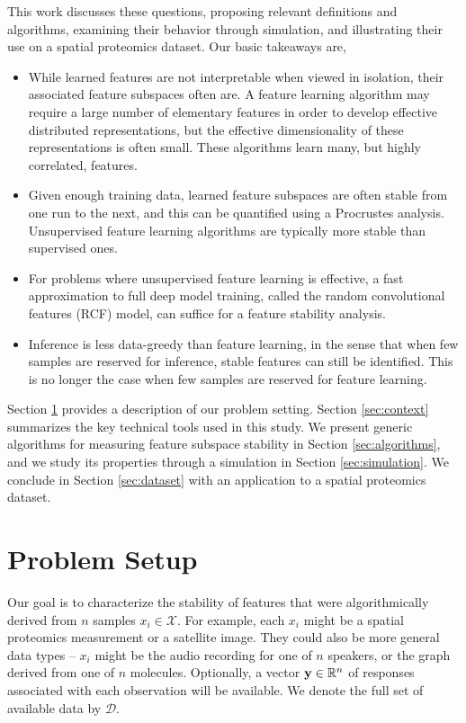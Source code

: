 This work discusses these questions, proposing relevant definitions and
algorithms, examining their behavior through simulation, and illustrating their
use on a spatial proteomics dataset. Our basic takeaways are,

\begin{itemize}
\item While learned features are not interpretable when viewed in isolation,
  their associated feature subspaces often are. A feature learning algorithm may
  require a large number of elementary features in order to develop effective
  distributed representations, but the effective dimensionality of these
  representations is often small. These algorithms learn many, but highly
  correlated, features.
\item Given enough training data, learned feature subspaces are often stable
  from one run to the next, and this can be quantified using a Procrustes
  analysis. Unsupervised feature learning algorithms are typically more stable
  than supervised ones.
\item For problems where unsupervised feature learning is effective, a fast
  approximation to full deep model training, called the random convolutional
  features (RCF) model, can suffice for a feature stability analysis.
\item Inference is less data-greedy than feature learning, in the sense that
  when few samples are reserved for inference, stable features can still be
  identified. This is no longer the case when few samples are reserved for
  feature learning.
\end{itemize}

Section \ref{sec:psetup} provides a description of our problem setting. Section
\ref{sec:context} summarizes the key technical tools used in this study. We
present generic algorithms for measuring feature subspace stability in Section
\ref{sec:algorithms}, and we study its properties through a simulation in
Section \ref{sec:simulation}. We conclude in Section \ref{sec:dataset} with an
application to a spatial proteomics dataset.

\section{Problem Setup}
\label{sec:psetup}

Our goal is to characterize the stability of features that were algorithmically
derived from $n$ samples $x_i \in \mathcal{X}$. For example, each $x_{i}$ might
be a spatial proteomics measurement or a satellite image. They could also be
more general data types -- $x_i$ might be the audio recording for one of $n$
speakers, or the graph derived from one of $n$ molecules. Optionally, a vector
$\mathbf{y}\in \mathbb{R}^{n}$ of responses associated with each observation will be
available. We denote the full set of available data by $\mathcal{D}$.

